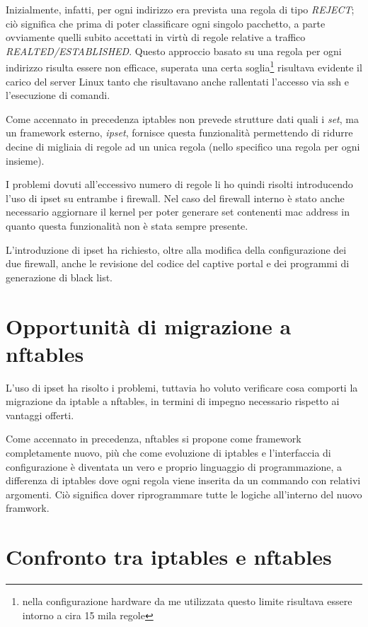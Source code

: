 Inizialmente, infatti, per ogni indirizzo era prevista una regola di tipo {\em
REJECT}; ciò significa che prima di poter classificare ogni singolo pacchetto,
a parte ovviamente quelli subito accettati in virtù di regole relative a
traffico {\em REALTED/ESTABLISHED}.  Questo approccio basato su una regola
per ogni indirizzo risulta essere non efficace, superata una certa
soglia\footnote{nella configurazione hardware da me utilizzata questo limite
risultava essere intorno a cira 15 mila regole} risultava evidente il carico
del server Linux tanto che risultavano anche rallentati l'accesso via ssh e
l'esecuzione di comandi.

Come accennato in precedenza iptables non prevede strutture dati quali i {\em
set}, ma un framework esterno, {\em ipset}, fornisce questa funzionalità
permettendo di ridurre decine di migliaia di regole ad un unica regola (nello
specifico una regola per ogni insieme).

I problemi dovuti all'eccessivo numero di regole li ho quindi risolti
introducendo l'uso di ipset su entrambe i firewall.  Nel caso del firewall
interno è stato anche necessario aggiornare il kernel per poter generare set
contenenti mac address in quanto questa funzionalità non è stata sempre
presente.

L'introduzione di ipset ha richiesto, oltre alla modifica della configurazione
dei due firewall, anche le revisione del codice del captive portal e dei
programmi di generazione di black list.

\section{Opportunità di migrazione a nftables}

L'uso di ipset ha risolto i problemi, tuttavia ho voluto verificare cosa
comporti la migrazione da iptable a nftables, in termini di impegno necessario
rispetto ai vantaggi offerti.

Come accennato in precedenza, nftables si propone come framework completamente
nuovo, più che come evoluzione di iptables  e l'interfaccia di configurazione
è diventata un vero e proprio linguaggio di programmazione, a differenza di
iptables dove ogni regola viene inserita da un commando con relativi
argomenti.  Ci\`o significa dover riprogrammare tutte le logiche all'interno
del nuovo framwork.

\section{Confronto tra iptables e nftables}

